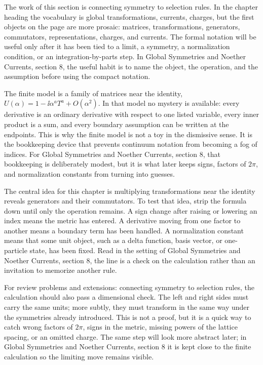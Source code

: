 The work of this section is connecting symmetry to selection rules.  In the chapter heading the vocabulary is global transformations, currents, charges, but the first objects on the page are more prosaic: matrices, transformations, generators, commutators, representations, charges, and currents.  The formal notation will be useful only after it has been tied to a limit, a symmetry, a normalization condition, or an integration-by-parts step.  In Global Symmetries and Noether Currents, section 8, the useful habit is to name the object, the operation, and the assumption before using the compact notation.

The finite model is a family of matrices near the identity, \(U(\alpha)=1-\ii\alpha^aT^a+O(\alpha^2)\).  In that model no mystery is available: every derivative is an ordinary derivative with respect to one listed variable, every inner product is a sum, and every boundary assumption can be written at the endpoints.  This is why the finite model is not a toy in the dismissive sense.  It is the bookkeeping device that prevents continuum notation from becoming a fog of indices.  For Global Symmetries and Noether Currents, section 8, that bookkeeping is deliberately modest, but it is what later keeps signs, factors of \(2\pi\), and normalization constants from turning into guesses.

The central idea for this chapter is multiplying transformations near the identity reveals generators and their commutators.  To test that idea, strip the formula down until only the operation remains.  A sign change after raising or lowering an index means the metric has entered.  A derivative moving from one factor to another means a boundary term has been handled.  A normalization constant means that some unit object, such as a delta function, basis vector, or one-particle state, has been fixed.  Read in the setting of Global Symmetries and Noether Currents, section 8, the line is a check on the calculation rather than an invitation to memorize another rule.

For review problems and extensions: connecting symmetry to selection rules, the calculation should also pass a dimensional check.  The left and right sides must carry the same units; more subtly, they must transform in the same way under the symmetries already introduced.  This is not a proof, but it is a quick way to catch wrong factors of \(2\pi\), signs in the metric, missing powers of the lattice spacing, or an omitted charge.  The same step will look more abstract later; in Global Symmetries and Noether Currents, section 8 it is kept close to the finite calculation so the limiting move remains visible.

